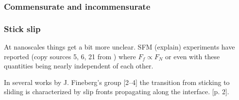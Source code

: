 




\subsubsection{Commensurate and incommensurate}
\subsubsection{Stick slip}



At nanoscales things get a bit more unclear. SFM (explain) experiments have reported (copy sources 5, 6, 21 from \cite{mo_friction_2009})
where $F_f \propto F_N$ or even with these quantities being nearly independent of each other.








In several works by J. Fineberg’s group [2–4] the transition from sticking to sliding is characterized by slip fronts propagating along the
interface. \cite{Manini_2017}[p. 2]. 



